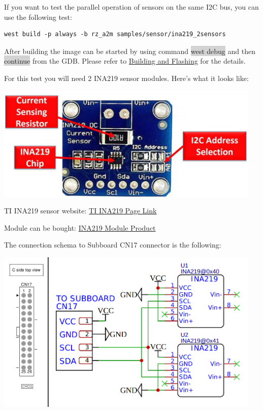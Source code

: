 \documentclass[11pt,a4paper,oneside]{article}
\begin{document}
If you want to test the parallel operation of sensors on the same I2C bus,
you can use the following test:

\begin{lstlisting}
west build -p always -b rz_a2m samples/sensor/ina219_2sensors
\end{lstlisting}

After building the image can be started by using command \colorbox{lightgray}{west debug}
and then \colorbox{lightgray}{continue} from the GDB. Please refer to
\hyperref[building-and-flashing]{Building and Flashing} for the
details.

For this test you will need 2 INA219 sensor modules. Here's what it looks like:

\includegraphics[width=5in]{./media/INA219_Module.jpg}

TI INA219 sensor website:
\href{https://www.ti.com/product/INA219}{TI INA219 Page Link}

Module can be bought:
\href{https://www.ebay.com/itm/266045143022?hash=item3df186b7ee:g:WgcAAOSwV8hjndFy&amdata=enc%3AAQAIAAAA4G3Cdgx8lqumNzR84HG5F%2FRa3SAIkQfAsqucnJhd9VktjVIIbxEVn%2FcBUvOpdiEI2lvKpHxeGi%2Fhtyj10XWYiVcdqCpPFvs6ArJXy7il4Fgk0JaWghpQnfz1%2FUQwZ6J6Ne1k02G5gtKKsbf3miD9MQNgCii%2B4DnnAMjsACTISV7OSLZnCBNTBwapu4U3mQZgVKeGFjfmdjgIgRbd20NgqymaY5VOyzliPqPc2Wku7kS%2BGndGjUVem3tT7BXr4iEJeMlbZgd1ZdHncruw6ni%2F2l1071%2BoF%2FUx18XerDyZCok%2B%7Ctkp%3ABk9SR_7ws7ztYg}{INA219 Module Product}

The connection schema to Subboard CN17 connector is the following:

\includegraphics[width=5in]{./media/INA219_connection.png}
\end{document}

